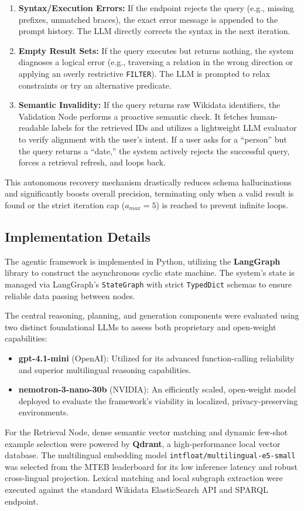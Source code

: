 \begin{enumerate}
    \item \textbf{Syntax/Execution Errors:} If the endpoint rejects the query (e.g., missing prefixes, unmatched braces), the exact error message is appended to the prompt history. The LLM directly corrects the syntax in the next iteration.
    \item \textbf{Empty Result Sets:} If the query executes but returns nothing, the system diagnoses a logical error (e.g., traversing a relation in the wrong direction or applying an overly restrictive \texttt{FILTER}). The LLM is prompted to relax constraints or try an alternative predicate.
    \item \textbf{Semantic Invalidity:} If the query returns raw Wikidata identifiers, the Validation Node performs a proactive semantic check. It fetches human-readable labels for the retrieved IDs and utilizes a lightweight LLM evaluator to verify alignment with the user's intent. If a user asks for a ``person'' but the query returns a ``date,'' the system actively rejects the successful query, forces a retrieval refresh, and loops back.
\end{enumerate}

This autonomous recovery mechanism drastically reduces schema hallucinations and significantly boosts overall precision, terminating only when a valid result is found or the strict iteration cap ($a_{max} = 5$) is reached to prevent infinite loops.

\subsection{Implementation Details}
\label{sec:implementation_details}

The agentic framework is implemented in Python, utilizing the \textbf{LangGraph} library to construct the asynchronous cyclic state machine. The system's state is managed via LangGraph's \texttt{StateGraph} with strict \texttt{TypedDict} schemas to ensure reliable data passing between nodes.

The central reasoning, planning, and generation components were evaluated using two distinct foundational LLMs to assess both proprietary and open-weight capabilities:
\begin{itemize}
    \item \textbf{gpt-4.1-mini} (OpenAI): Utilized for its advanced function-calling reliability and superior multilingual reasoning capabilities.
    \item \textbf{nemotron-3-nano-30b} (NVIDIA): An efficiently scaled, open-weight model deployed to evaluate the framework's viability in localized, privacy-preserving environments.
\end{itemize}
For the Retrieval Node, dense semantic vector matching and dynamic few-shot example selection were powered by \textbf{Qdrant}, a high-performance local vector database. The multilingual embedding model \texttt{intfloat/multilingual-e5-small} was selected from the MTEB leaderboard for its low inference latency and robust cross-lingual projection. Lexical matching and local subgraph extraction were executed against the standard Wikidata ElasticSearch API and SPARQL endpoint. 

